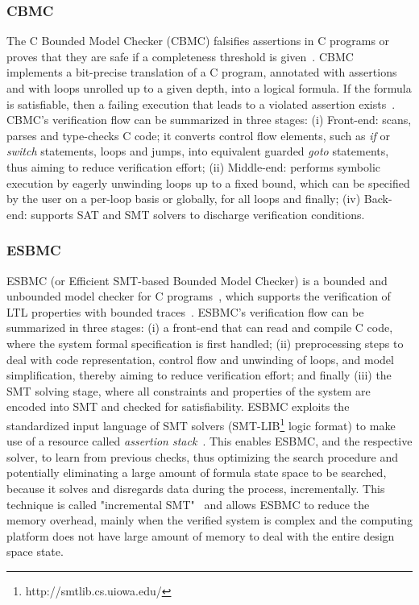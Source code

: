 \documentclass[review]{elsarticle}
\begin{document}
\subsubsection{CBMC}

The C Bounded Model Checker (CBMC) falsifies assertions in C programs 
or proves that they are safe if a completeness threshold is given~\cite{Kroening}. 
CBMC implements a bit-precise translation of a C program, annotated with assertions 
and with loops unrolled up to a given depth, into a logical formula. If the formula is satisfiable, 
then a failing execution that leads to a violated assertion exists~\cite{Kroening}. CBMC's verification 
flow can be summarized in three stages: (i) Front-end: scans, parses and type-checks C code; 
it converts control flow elements, such as \textit{if} or \textit{switch} statements, loops and jumps, 
into equivalent guarded \textit{goto} statements, thus aiming to reduce verification effort; 
(ii) Middle-end: performs symbolic execution by eagerly unwinding loops up to a fixed bound, 
which can be specified by the user on a per-loop basis or globally, for all loops and finally; 
(iv) Back-end: supports SAT and SMT solvers to discharge verification conditions.

\subsubsection{ESBMC}

ESBMC (or Efficient SMT-based Bounded Model Checker) is a bounded and unbounded model checker for C programs~\cite{esbmc2018}, which supports the verification of LTL properties with bounded traces~\cite{DBLP:journals/sosym/MorseCN015}. ESBMC's verification flow can be summarized in three stages: (i) a front-end that can read and compile C code, where the system formal specification is first handled; (ii) preprocessing steps to deal with code representation, control flow and unwinding of loops, and model simplification, thereby aiming to reduce verification effort; and finally (iii) the SMT solving stage, where all constraints and properties of the system are encoded into SMT and checked for satisfiability. ESBMC exploits the standardized input language of SMT solvers (SMT-LIB\footnote{http://smtlib.cs.uiowa.edu/} logic format) to make use of a resource called \textit{assertion stack}~\cite{Morse2015}. This enables ESBMC, and the respective solver, to learn from previous checks, thus optimizing the search procedure and potentially eliminating a large amount of formula state space to be searched, because it solves and disregards data during the process, incrementally. This technique is called "incremental SMT"~\cite{DBLP:journals/fac/SchrammelKBMTB17} and allows ESBMC to reduce the memory overhead, mainly when the verified system is complex and the computing platform does not have large amount of memory to deal with the entire design space state.
\end{document}
